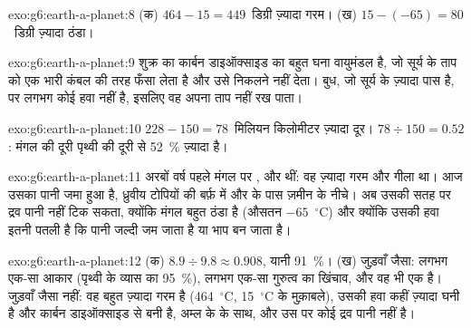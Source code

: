 \begin{solution}{exo:g6:earth-a-planet:8}
(क) $464 - 15 = 449$~डिग्री ज़्यादा गरम। (ख) $15 - (-65) = 80$~डिग्री ज़्यादा ठंडा।
\end{solution}

\begin{solution}{exo:g6:earth-a-planet:9}
शुक्र का कार्बन डाइऑक्साइड का बहुत घना वायुमंडल है, जो सूर्य के ताप को एक भारी कंबल
की तरह फँसा लेता है और उसे निकलने नहीं देता। बुध, जो सूर्य के ज़्यादा पास है, पर
लगभग कोई हवा नहीं है, इसलिए वह अपना ताप नहीं रख पाता।
\end{solution}

\begin{solution}{exo:g6:earth-a-planet:10}
$228 - 150 = 78$~मिलियन किलोमीटर ज़्यादा दूर। $78 \div 150 = 0.52$: मंगल की
दूरी पृथ्वी की दूरी से 52~\% ज़्यादा है।
\end{solution}

\begin{solution}{exo:g6:earth-a-planet:11}
अरबों वर्ष पहले मंगल पर ,  और  थीं: वह ज़्यादा गरम और गीला था।
आज उसका पानी जमा हुआ है, ध्रुवीय टोपियों की बर्फ़ में और  के पास ज़मीन के
नीचे। अब उसकी सतह पर द्रव पानी नहीं टिक सकता, क्योंकि मंगल बहुत ठंडा है (औसतन
$-65$~$^\circ$C) और क्योंकि उसकी हवा इतनी पतली है कि पानी जल्दी जम जाता है या
भाप बन जाता है।
\end{solution}

\begin{solution}{exo:g6:earth-a-planet:12}
(क) $8.9 \div 9.8 \approx 0.908$, यानी 91~\%। (ख) जुड़वाँ जैसा: लगभग
एक-सा आकार (पृथ्वी के व्यास का 95~\%), लगभग एक-सा गुरुत्व का
खिंचाव, और वह भी एक  है। जुड़वाँ जैसा नहीं: वह बहुत ज़्यादा गरम है
(464~$^\circ$C, 15~$^\circ$C के मुक़ाबले), उसकी हवा कहीं ज़्यादा घनी है और कार्बन
डाइऑक्साइड से बनी है, अम्ल के  के साथ, और उस पर कोई द्रव पानी नहीं है।
\end{solution}

